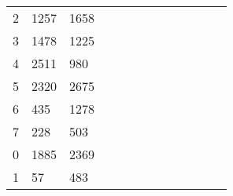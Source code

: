 \begin{table}[tb]
\begin{tabular}{|l|l|l|llllllllll}
		2 & 1257 & 1658 &                           &                          &                          &                          &                           &                          &                           &                           &                           &                           \\ \cline{1-3}
		3 & 1478 & 1225 &                           &                          &                          &                          &                           &                          &                           &                           &                           &                           \\ \cline{1-3}
		4 & 2511 & 980  &                           &                          &                          &                          &                           &                          &                           &                           &                           &                           \\ \cline{1-3}
		5 & 2320 & 2675 &                           &                          &                          &                          &                           &                          &                           &                           &                           &                           \\ \cline{1-3}
		6 & 435  & 1278 &                           &                          &                          &                          &                           &                          &                           &                           &                           &                           \\ \cline{1-3}
		7 & 228  & 503  &                           &                          &                          &                          &                           &                          &                           &                           &                           &                           \\ \cline{1-3}
		0 & 1885 & 2369 &                           &                          &                          &                          &                           &                          &                           &                           &                           &                           \\ \cline{1-3}
		1 & 57   & 483  &                           &                          &                          &                          &                           &                          &                           &                           &                           &                           \\ \cline{1-3}

\end{tabular}
\end{table}
